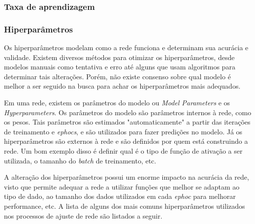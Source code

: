 \subsubsection{Taxa de aprendizagem} \label{sssec:learning-rate}

\subsubsection{Hiperparâmetros} \label{sssec:hiperparameters}

Os hiperparâmetros modelam como a rede funciona e determinam sua acurácia e validade. Existem diversos métodos para otimizar os hiperparâmetros, desde modelos manuais como tentativa e erro até alguns que usam algoritmos para determinar tais alterações. Porém, não existe consenso sobre qual modelo é melhor a ser seguido na busca para achar os hiperparâmetros mais adequados.

Em uma rede, existem os parâmetros do modelo ou \textit{Model Parameters} e os \textit{Hyperparameters}. Os parâmetros do modelo são parâmetros internos à rede, como os pesos. Tais parâmetros são estimados "automaticamente" a partir das iterações de treinamento e \textit{ephocs}, e são utilizados para fazer predições no modelo. Já os hiperparâmetros são externos à rede e são definidos por quem está construindo a rede. Um bom exemplo disso é definir qual é o tipo de função de ativação a ser utilizada, o tamanho do \textit{batch} de treinamento, etc.

A alteração dos hiperparâmetros possui um enorme impacto na acurácia da rede, visto que permite adequar a rede a utilizar funções que melhor se adaptam ao tipo de dado, ao tamanho dos dados utilizados em cada \textit{ephoc} para melhorar performance, etc. A lista de alguns dos mais comuns hiperparâmetros utilizados nos processos de ajuste de rede são listados a seguir.

